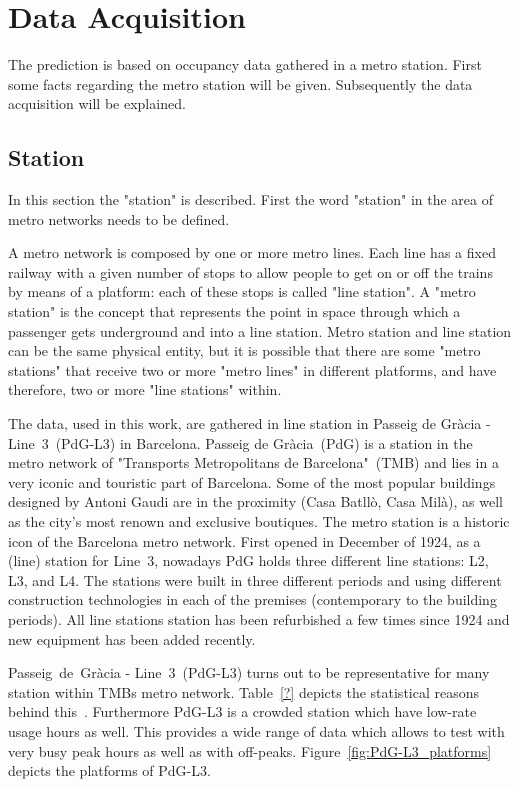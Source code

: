 \section{Data Acquisition}
\label{sec:dataAcquisition}

The prediction is based on occupancy data gathered in a metro station. First some facts regarding the metro station will be given. Subsequently the data acquisition will be explained.

\subsection{Station}
\label{subsec:station}

In this section the "station" is described. First the word "station" in the area of metro networks needs to be defined.

A metro network is composed by one or more metro lines. Each line has a fixed railway with a given number of stops to allow people to get on or off the trains by means of a platform: each of these stops is called "line station". A "metro station" is the concept that represents the point in space through which a passenger gets underground and into a line station. Metro station and line station can be the same physical entity, but it is possible that there are some "metro stations" that receive two or more "metro lines" in different platforms, and have therefore, two or more "line stations" within.

The data, used in this work, are gathered in line station in Passeig de Gr\`{a}cia - Line~3~(PdG-L3) in Barcelona. Passeig de Gr\`{a}cia~(PdG) is a station in the metro network of "Transports Metropolitans de Barcelona"~(TMB) and lies in a very iconic and touristic part of Barcelona. Some of the most popular buildings designed by Antoni Gaudi are in the proximity (Casa Batll\`{o}, Casa Mil\`{a}), as well as the city's most renown and exclusive boutiques.
The metro station is a historic icon of the Barcelona metro network. First opened in December of 1924, as a (line) station for Line~3, nowadays PdG holds three different line stations: L2, L3, and L4. The stations were built in three different periods and using different construction technologies in each of the premises (contemporary to the building periods). All line stations station has been refurbished a few times since 1924 and new equipment has been added recently.

Passeig~de~Gr\`{a}cia - Line~3~(PdG-L3) turns out to be representative for many station within TMBs metro network. Table~\ref{?} depicts the statistical reasons behind this~\cite{TMB}. Furthermore PdG-L3 is a crowded station which have low-rate usage hours as well. This provides a wide range of data which allows to test with very busy peak hours as well as with off-peaks. Figure~\ref{fig:PdG-L3_platforms} depicts the platforms of PdG-L3.


